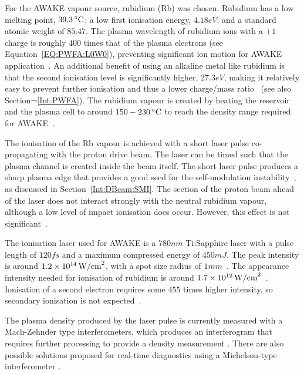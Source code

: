 For the AWAKE vapour source, rubidium (Rb) was chosen.
Rubidium has a low melting point, $39.3\celsius$; a low first ionisation energy, $4.18\unit{eV}$; and a standard atomic weight of $85.47$.
The plasma wavelength of rubidium ions with a $+1$ charge is roughly $400$ times that of the plasma electrons (see Equation~\ref{EQ:PWFA:L0W0}), preventing significant ion motion for AWAKE application~\cite{vieira:2012a}.
An additional benefit of using an alkaline metal like rubidium is that the second ionisation level is significantly higher, $27.3\unit{eV}$, making it relatively easy to prevent further ionisation and thus a lower charge/mass ratio~\cite{awake_collaboration:2017} (see also Section¬\ref{Int:PWFA}).
The rubidium vapour is created by heating the reservoir and the plasma cell to around $150-230\celsius$ to reach the density range required for AWAKE~\cite{caldwell:2015,muggli:2017a}.

The ionisation of the Rb vapour is achieved with a short laser pulse co-propagating with the proton drive beam.
The laser can be timed such that the plasma channel is created inside the beam itself.
The short laser pulse produces a sharp plasma edge that provides a good seed for the self-modulation instability~\cite{vieira:2014a}, as discussed in Section~\ref{Int:DBeam:SMI}.
The section of the proton beam ahead of the laser does not interact strongly with the neutral rubidium vapour, although a low level of impact ionisation does occur.
However, this effect is not significant~\cite{awake_collaboration:2017}.

The ionisation laser used for AWAKE is a $780\unit{nm}$ Ti:Sapphire laser with a pulse length of $120\unit{fs}$ and a maximum compressed energy of $450\unit{mJ}$.
The peak intensity is around $1.2\nexp{14}\unit{W/cm}^{2}$, with a spot size radius of $1\unit{mm}$~\cite{awake_collaboration:2017}.
The appearance intensity needed for ionisation of rubidium is around $1.7\nexp{12}\unit{W/cm}^{2}$~\cite{augst:1989}.
Ionisation of a second electron requires some $455$ times higher intensity, so secondary ionisation is not expected~\cite{muggli:2017a}.

The plasma density produced by the laser pulse is currently measured with a Mach-Zehnder type interferometers, which produces an interferogram that requires further processing to provide a density measurement \cite{oz:2016}.
There are also possible solutions proposed for real-time diagnostics using a Michelson-type interferometer \cite{djotyan:2018}.

